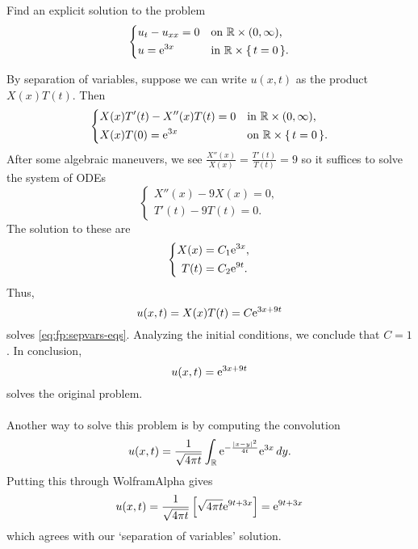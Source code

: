 \begin{problem}
  Find an explicit solution to the problem
  \[
    \left\{
      \begin{aligned}
        &u_t-u_{xx}=0&&\text{on \(\mathbb{R}\times(0,\infty)\),}\\
        &u=\mathrm{e}^{3x}&&\text{in \(\mathbb{R}\times\{\,t=0\,\}\).}
      \end{aligned}
    \right.
  \]
\end{problem}
\begin{solution*}
  By separation of variables, suppose we can write \(u(x,t)\) as the
  product \(X(x)T(t)\). Then
  \begin{equation}
    \label{eq:fp:sepvars-eqs}
    \left\{
      \begin{aligned}
        &X(x)T'(t)-X''(x)T(t)=0&&\text{in \(\mathbb{R}\times(0,\infty)\),}\\
        &X(x)T(0)=\mathrm{e}^{3x}&&\text{on \(\mathbb{R}\times\{\,t=0\,\}\).}
      \end{aligned}
    \right.
  \end{equation}
  After some algebraic maneuvers, we see
  \(\frac{X''(x)}{X(x)}=\frac{T'(t)}{T(t)}=9\) so it suffices to solve the
  system of ODEs
  \[
    \left\{
      \begin{aligned}
        X''(x)-9X(x)=0,\\
        T'(t)-9T(t)=0.
      \end{aligned}
    \right.
  \]
  The solution to these are
  \[
    \left\{%
      \begin{aligned}
        X(x)&=C_1\rme^{3x},\\
        T(t)&=C_2\rme^{9t}.
      \end{aligned}
    \right.
  \]
  Thus,
  \[
    u(x,t)=X(x)T(t)=C\mathrm{e}^{3x+9t}
  \]
  solves \eqref{eq:fp:sepvars-eqs}. Analyzing the initial conditions, we
  conclude that \(C=1\). In conclusion,
  \[
    u(x,t)=\mathrm{e}^{3x+9t}
  \]
  solves the original problem.
  \\\\
  Another way to solve this problem is by computing the convolution
  \[
    u(x,t)=%
    \frac{1}{\sqrt{4\pi t}}
    \int_\R \rme^{-\frac{|x-y|^2}{4t}}
    \rme^{3x}\diff y.
  \]
  Putting this through \textsf{WolframAlpha} gives
  \[
    u(x,t)=%
    \frac{1}{\sqrt{4\pi t}}%
    \left[%
      \sqrt{4\pi t}\rme^{9t+3x}%
    \right]=%
    \rme^{9t+3x}
  \]
  which agrees with our `separation of variables' solution.
\end{solution*}

